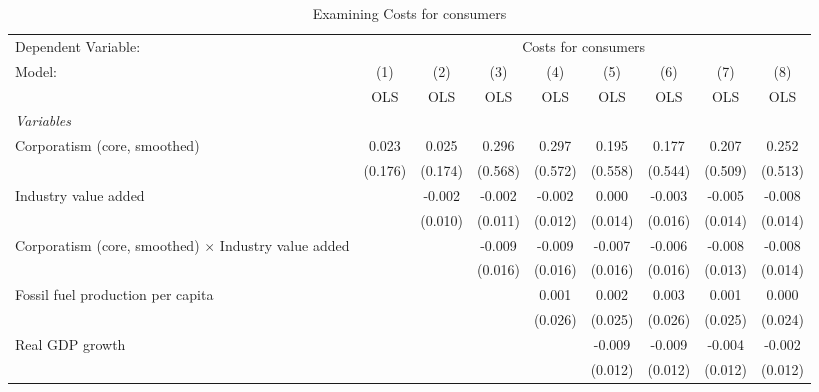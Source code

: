 
\begin{table}[htbp]
   \caption{Examining Costs for consumers}
   \centering
   \begin{tabular}{lcccccccc}
      \toprule
      Dependent Variable: & \multicolumn{8}{c}{Costs for consumers}\\
      Model:                                                      & (1)     & (2)     & (3)     & (4)     & (5)     & (6)     & (7)     & (8)\\  
                                                                  &  OLS    & OLS     & OLS     & OLS     & OLS     & OLS     & OLS     & OLS\\  
      \midrule
      \emph{Variables}\\
      Corporatism (core, smoothed)                                & 0.023   & 0.025   & 0.296   & 0.297   & 0.195   & 0.177   & 0.207   & 0.252\\   
                                                                  & (0.176) & (0.174) & (0.568) & (0.572) & (0.558) & (0.544) & (0.509) & (0.513)\\   
      Industry value added                                        &         & -0.002  & -0.002  & -0.002  & 0.000   & -0.003  & -0.005  & -0.008\\   
                                                                  &         & (0.010) & (0.011) & (0.012) & (0.014) & (0.016) & (0.014) & (0.014)\\   
      Corporatism (core, smoothed) $\times$ Industry value added  &         &         & -0.009  & -0.009  & -0.007  & -0.006  & -0.008  & -0.008\\   
                                                                  &         &         & (0.016) & (0.016) & (0.016) & (0.016) & (0.013) & (0.014)\\   
      Fossil fuel production per capita                           &         &         &         & 0.001   & 0.002   & 0.003   & 0.001   & 0.000\\   
                                                                  &         &         &         & (0.026) & (0.025) & (0.026) & (0.025) & (0.024)\\   
      Real GDP growth                                             &         &         &         &         & -0.009  & -0.009  & -0.004  & -0.002\\   
                                                                  &         &         &         &         & (0.012) & (0.012) & (0.012) & (0.012)\\   

\end{tabular}
\end{table}
